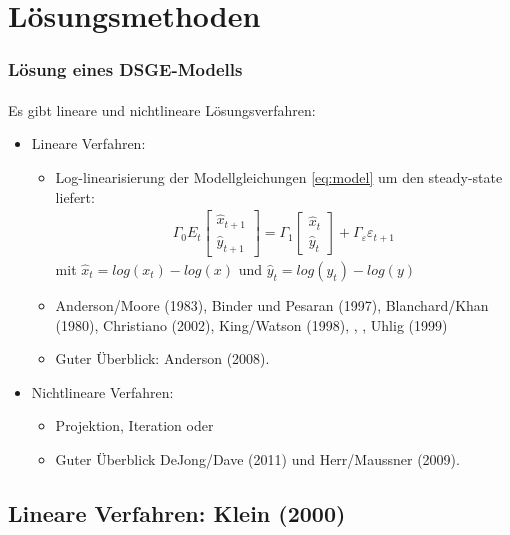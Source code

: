 \documentclass[10pt]{beamer}  %
\begin{document}
\section{L\"{o}sungsmethoden}
\begin{frame}\frametitle{L\"{o}sung eines DSGE-Modells}\framesubtitle{}
Es gibt lineare und nichtlineare L\"{o}sungsverfahren:
\begin{itemize}
\item Lineare Verfahren:
\begin{itemize}
\item Log-linearisierung der Modellgleichungen \eqref{eq:model} um den steady-state liefert:
\begin{align}
 \Gamma_0 E_t\begin{bmatrix}\hat{x}_{t+1}\\\hat{y}_{t+1}\end{bmatrix} = \Gamma_1 \begin{bmatrix}\hat{x}_{t}\\\hat{y}_{t}\end{bmatrix} + \Gamma_\varepsilon \varepsilon_{t+1}\label{eq:logmodel}
\end{align}
mit $\hat{x}_t=log(x_t) - log(x)$ und $\hat{y}_t=log(y_t) - log(y)$
\item Anderson/Moore (1983), Binder und Pesaran (1997), Blanchard/Khan (1980), Christiano (2002), King/Watson (1998), , , Uhlig (1999)
\item Guter \"{U}berblick: Anderson (2008).
\end{itemize}
\item Nichtlineare Verfahren:
\begin{itemize}
\item Projektion, Iteration oder 
\item Guter \"{U}berblick DeJong/Dave (2011) und Herr/Maussner (2009).
\end{itemize}
\end{itemize}
\end{frame}


\subsection{Lineare Verfahren: Klein (2000)}
\end{document}
